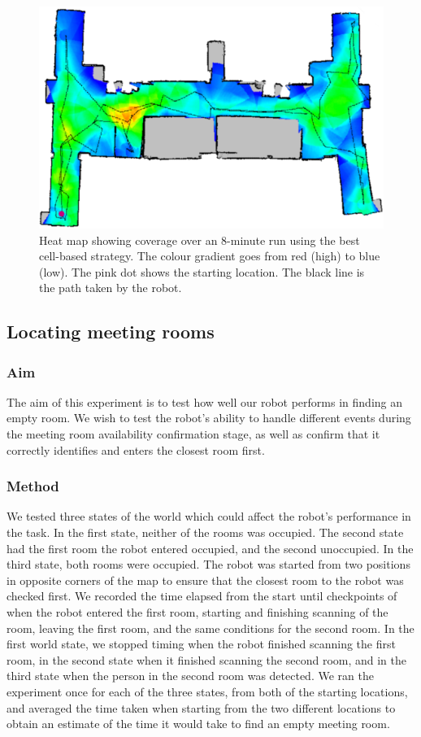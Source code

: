 \documentclass[conference]{IEEEtran}
\begin{document}
\begin{figure}[b]
  \includegraphics[width=\columnwidth]{4-1_1}
  \caption{Heat map showing coverage over an 8-minute run using the best cell-based strategy. The colour gradient goes from red (high) to blue (low). The pink dot shows the starting location. The black line is the path taken by the robot.}
  \label{fig:heatmap}
\end{figure}
\subsection{Locating meeting rooms}

\subsubsection{Aim}
The aim of this experiment is to test how well our robot performs in finding an empty room. We wish to test the robot's ability to handle different events during the meeting room availability confirmation stage, as well as confirm that it correctly identifies and enters the closest room first.
\subsubsection{Method}
We tested three states of the world which could affect the robot's performance in the task. In the first state, neither of the rooms was occupied. The second state had the first room the robot entered occupied, and the second unoccupied. In the third state, both rooms were occupied. The robot was started from two positions in opposite corners of the map to ensure that the closest room to the robot was checked first. We recorded the time elapsed from the start until checkpoints of when the robot entered the first room, starting and finishing scanning of the room, leaving the first room, and the same conditions for the second room. In the first world state, we stopped timing when the robot finished scanning the first room, in the second state when it finished scanning the second room, and in the third state when the person in the second room was detected. We ran the experiment once for each of the three states, from both of the starting locations, and averaged the time taken when starting from the two different locations to obtain an estimate of the time it would take to find an empty meeting room.
\end{document}
